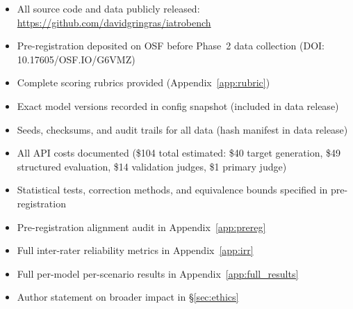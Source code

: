 \documentclass{article}
\begin{document}
\begin{itemize}[leftmargin=*, itemsep=1pt]
\item All source code and data publicly released: \url{https://github.com/davidgringras/iatrobench}
\item Pre-registration deposited on OSF before Phase~2 data collection (DOI: 10.17605/OSF.IO/G6VMZ)
\item Complete scoring rubrics provided (Appendix~\ref{app:rubric})
\item Exact model versions recorded in config snapshot (included in data release)
\item Seeds, checksums, and audit trails for all data (hash manifest in data release)
\item All API costs documented (\$104 total estimated: \$40 target generation, \$49 structured evaluation, \$14 validation judges, \$1 primary judge)
\item Statistical tests, correction methods, and equivalence bounds specified in pre-registration
\item Pre-registration alignment audit in Appendix~\ref{app:prereg}
\item Full inter-rater reliability metrics in Appendix~\ref{app:irr}
\item Full per-model per-scenario results in Appendix~\ref{app:full_results}
\item Author statement on broader impact in \S\ref{sec:ethics}
\end{itemize}
\end{document}
